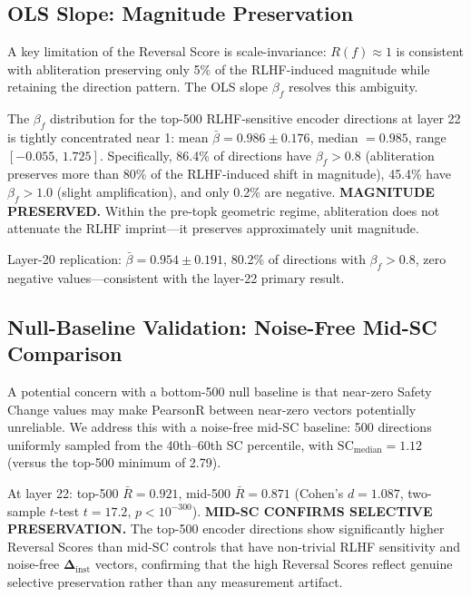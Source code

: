 \documentclass[11pt,letterpaper]{article}
\begin{document}
\subsection{OLS Slope: Magnitude Preservation}
\label{sec:ols}

A key limitation of the Reversal Score is scale-invariance: $R(f) \approx 1$ is consistent with
abliteration preserving only 5\% of the RLHF-induced magnitude while retaining the direction pattern.
The OLS slope $\beta_f$ resolves this ambiguity.

The $\beta_f$ distribution for the top-500 RLHF-sensitive encoder directions at layer 22 is tightly
concentrated near 1: mean $\bar{\beta} = 0.986 \pm 0.176$, median $= 0.985$, range $[-0.055,\, 1.725]$.
Specifically, 86.4\% of directions have $\beta_f > 0.8$ (abliteration preserves more than 80\% of
the RLHF-induced shift in magnitude), 45.4\% have $\beta_f > 1.0$ (slight amplification), and only
0.2\% are negative. \textbf{MAGNITUDE PRESERVED.} Within the pre-topk geometric regime, abliteration
does not attenuate the RLHF imprint---it preserves approximately unit magnitude.

Layer-20 replication: $\bar{\beta} = 0.954 \pm 0.191$, 80.2\% of directions with $\beta_f > 0.8$,
zero negative values---consistent with the layer-22 primary result.

\subsection{Null-Baseline Validation: Noise-Free Mid-SC Comparison}
\label{sec:baseline}

A potential concern with a bottom-500 null baseline is that near-zero Safety Change values may make
PearsonR between near-zero vectors potentially unreliable. We address this with a noise-free mid-SC
baseline: 500 directions uniformly sampled from the 40th--60th SC percentile, with
$\text{SC}_{\text{median}} = 1.12$ (versus the top-500 minimum of 2.79).

At layer 22: top-500 $\bar{R} = 0.921$, mid-500 $\bar{R} = 0.871$ (Cohen's $d = 1.087$,
two-sample $t$-test $t = 17.2$, $p < 10^{-300}$). \textbf{MID-SC CONFIRMS SELECTIVE PRESERVATION.}
The top-500 encoder directions show significantly higher Reversal Scores than mid-SC controls that
have non-trivial RLHF sensitivity and noise-free $\boldsymbol{\Delta}_{\text{inst}}$ vectors,
confirming that the high Reversal Scores reflect genuine selective preservation rather than any
measurement artifact.
\end{document}
